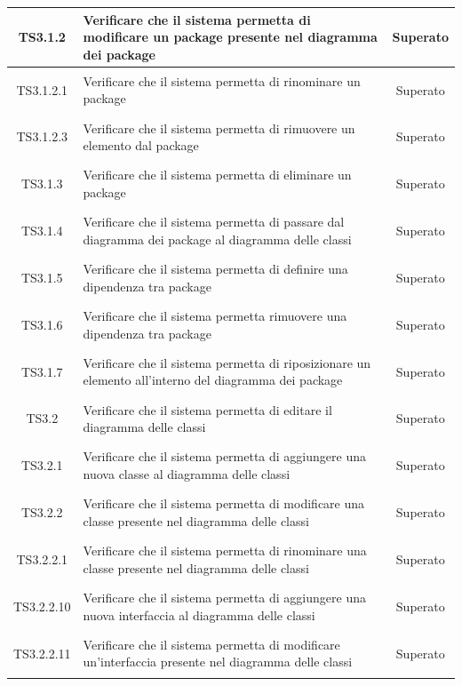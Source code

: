 \documentclass[../PianoDiQualifica.tex]{subfiles}
\begin{document}
\begin{longtable}{|c|>{\centering}p{10cm}|c|}
	\hline
	\hypertarget{TS3.1.2}{TS3.1.2} & Verificare che il sistema permetta di modificare un package presente nel diagramma dei package & Superato\\
	\hline
	\hypertarget{TS3.1.2.1}{TS3.1.2.1} & Verificare che il sistema permetta di rinominare un package & Superato \\
	\hline
	\hypertarget{TS3.1.2.3}{TS3.1.2.3} & Verificare che il sistema permetta di rimuovere un elemento dal package & Superato \\
	\hline
	\hypertarget{TS3.1.3}{TS3.1.3} & Verificare che il sistema permetta di eliminare un package & Superato \\
	\hline
	\hypertarget{TS3.1.4}{TS3.1.4} & Verificare che il sistema permetta di passare dal diagramma dei package al diagramma delle classi & Superato \\
	\hline
	\hypertarget{TS3.1.5}{TS3.1.5} & Verificare che il sistema permetta di definire una dipendenza tra package & Superato \\
	\hline
	\hypertarget{TS3.1.6}{TS3.1.6} & Verificare che il sistema permetta rimuovere una dipendenza tra package & Superato \\
	\hline
	\hypertarget{TS3.1.7}{TS3.1.7} & Verificare che il sistema permetta di riposizionare un elemento all'interno del diagramma dei package & Superato \\
	\hline
	\hypertarget{TS3.2}{TS3.2} & Verificare che il sistema permetta di editare il diagramma delle classi & Superato \\
	\hline
	\hypertarget{TS3.2.1}{TS3.2.1} & Verificare che il sistema permetta di aggiungere una nuova classe al diagramma delle classi & Superato \\
	\hline
	\hypertarget{TS3.2.2}{TS3.2.2} & Verificare che il sistema permetta di modificare una classe presente nel diagramma delle classi & Superato \\
	\hline
	\hypertarget{TS3.2.2.1}{TS3.2.2.1} & Verificare che il sistema permetta di rinominare una classe presente nel diagramma delle classi & Superato \\
	\hline
	\hypertarget{TS3.2.2.10}{TS3.2.2.10} & Verificare che il sistema permetta di aggiungere una nuova interfaccia al diagramma delle classi & Superato \\
	\hline
	\hypertarget{TS3.2.2.11}{TS3.2.2.11} & Verificare che il sistema permetta di modificare un'interfaccia presente nel diagramma delle classi & Superato \\

\end{longtable}
\end{document}

